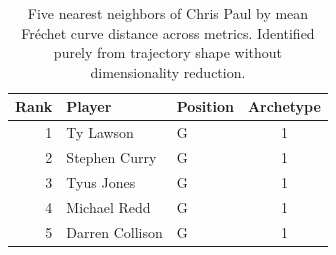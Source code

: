 \begin{table}[htbp]
  \centering\small
  \begin{tabular}{rllc}
    \toprule
    Rank & Player & Position & Archetype \\
    \midrule
    1 & Ty Lawson & G & 1 \\
    2 & Stephen Curry & G & 1 \\
    3 & Tyus Jones & G & 1 \\
    4 & Michael Redd & G & 1 \\
    5 & Darren Collison & G & 1 \\
    \bottomrule
  \end{tabular}
  \caption{Five nearest neighbors of Chris Paul by mean Fr\'{e}chet curve distance across metrics. Identified purely from trajectory shape without dimensionality reduction.}
  \label{tab:Chris_Paul_frechet_curve_neighbors}
\end{table}

